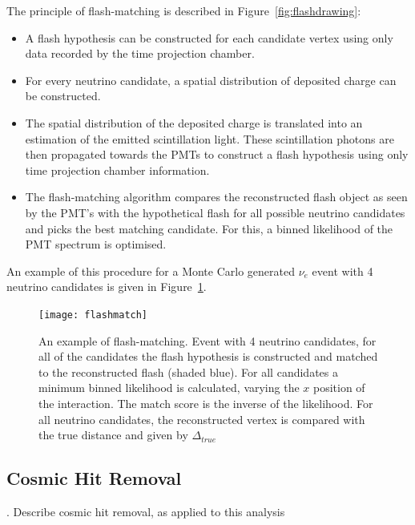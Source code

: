 The principle of flash-matching is described in Figure~\ref{fig:flashdrawing}:
\begin{itemize}
\item A flash hypothesis can be constructed for each candidate vertex using only data recorded by the time projection chamber.
\item For every neutrino candidate, a spatial distribution of deposited charge can be constructed.
\item The spatial distribution of the deposited charge is translated into an estimation of the emitted scintillation light. These scintillation photons are then propagated towards the PMTs to construct a flash hypothesis using only time projection chamber information.
\item The flash-matching algorithm compares the reconstructed flash object as seen by the PMT's with the hypothetical flash for all possible neutrino candidates and picks the best matching candidate. For this, a binned likelihood of the PMT spectrum is optimised.
\end{itemize}
An example of this procedure for a Monte Carlo generated $\nu_e$ event with 4 neutrino candidates is given in Figure~\ref{fig:flashmatch}.
\begin{figure}[!htbp]
\centering
\texttt{[image: flashmatch]} 
\caption{An example of flash-matching. Event with 4 neutrino candidates, for all of the candidates the flash hypothesis is constructed and matched to the reconstructed flash (shaded blue). For all candidates a minimum binned likelihood is calculated, varying the $x$ position of the interaction. The match score is the inverse of the likelihood. For all neutrino candidates, the reconstructed vertex is compared with the true distance and given by $\Delta_{true}$ } 
\label{fig:flashmatch}
\end{figure}


\subsection{Cosmic Hit Removal}
.  Describe cosmic hit removal, as applied to this analysis


